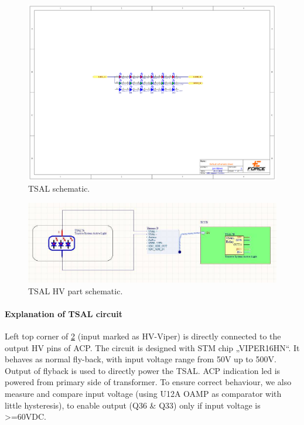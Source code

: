 \begin{figure}[H]
	\centering
	\includegraphics[width=\textwidth,trim={6cm 10cm 6cm 7cm},clip]{./img/TSAL-schematic.pdf}
	\caption{TSAL schematic.}
	\label{fig:TSAL-schematic}
\end{figure}

\begin{figure}[H]
	\centering
	\includegraphics[width=\textwidth]{./img/tsal-wiring.jpg}
	\caption{TSAL HV part schematic.}
	\label{fig:TSAL-HV}
\end{figure}

\paragraph{Explanation of TSAL circuit}

Left top corner of \ref{fig:TSAL-HV} (input marked as HV-Viper) is directly connected to the output HV pins of ACP. The circuit is designed with STM chip „VIPER16HN“. It behaves as normal fly-back, with input voltage range from 50V up to 500V. Output of flyback is used to directly power the TSAL. ACP indication led is powered from primary side of transformer. To ensure correct behaviour, we also measure and compare input voltage (using U12A OAMP as comparator with little hysteresis), to enable output (Q36 \& Q33) only if input voltage is >=60VDC.

